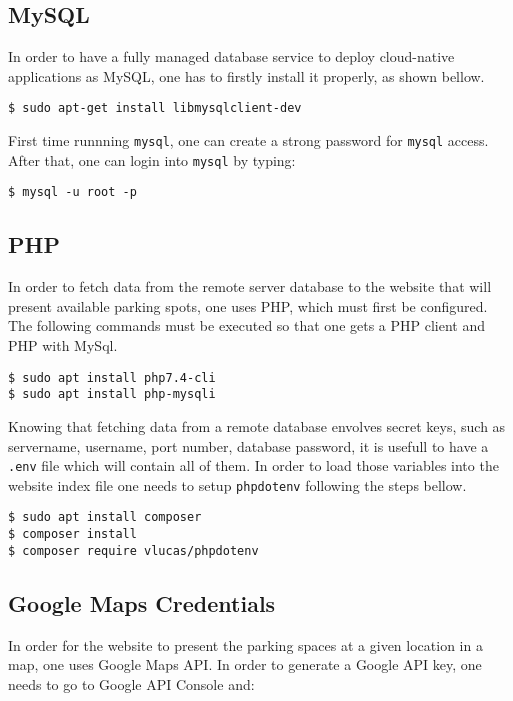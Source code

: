 \subsection{MySQL}
In order to have a fully managed database service to deploy cloud-native applications as MySQL, one has to firstly install it properly, as shown bellow.

\begin{lstlisting}
$ sudo apt-get install libmysqlclient-dev
\end{lstlisting}

First time runnning \verb|mysql|, one can create a strong password for \verb|mysql| access. After that, one can login into \verb|mysql| by typing:

\begin{lstlisting}
$ mysql -u root -p
\end{lstlisting}

\subsection{PHP}
In order to fetch data from the remote server database to the website that will present available parking spots, one uses PHP, which must first be configured. The following commands must be executed so that one gets a PHP client and PHP with MySql.

\begin{lstlisting}
$ sudo apt install php7.4-cli
$ sudo apt install php-mysqli
\end{lstlisting}

Knowing that fetching data from a remote database envolves secret keys, such as servername, username, port number, database password, it is usefull to have a \verb|.env| file which will contain all of them. In order to load those variables into the website index file one needs to setup \verb|phpdotenv| following the steps bellow. \cite{phpdotenv}

\begin{lstlisting}
$ sudo apt install composer
$ composer install
$ composer require vlucas/phpdotenv
\end{lstlisting}

\subsection{Google Maps Credentials}
In order for the website to present the parking spaces at a given location in a map, one uses Google Maps API. In order to generate a Google API key, one needs to go to Google API Console \cite{googleapi} and:

